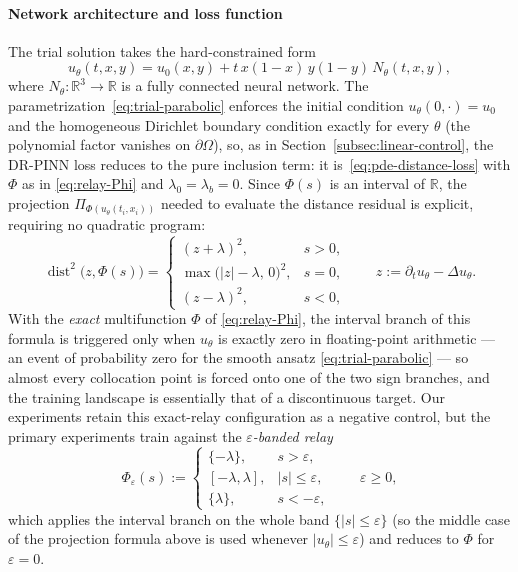 \documentclass[11pt]{elsarticle}
\theoremstyle{definition}
\theoremstyle{remark}
\numberwithin{equation}{section}
\def\dist{\operatorname{dist}}
\begin{document}
\paragraph{Network architecture and loss function}
The trial solution takes the hard-constrained form
\begin{equation}
	\label{eq:trial-parabolic}
	u_\theta(t,x,y)
	= u_0(x,y) + t\,x(1-x)\,y(1-y)\,N_\theta(t,x,y),
\end{equation}
where $N_\theta:\mathbb{R}^3\to\mathbb{R}$ is a fully connected neural
network. The parametrization~\eqref{eq:trial-parabolic} enforces the
initial condition $u_\theta(0,\cdot)=u_0$ and the homogeneous Dirichlet
boundary condition exactly for every $\theta$ (the polynomial factor
vanishes on $\partial\Omega$), so, as in
Section~\ref{subsec:linear-control}, the DR-PINN loss reduces to the pure
inclusion term: it is~\eqref{eq:pde-distance-loss} with
$\Phi$ as in \eqref{eq:relay-Phi} and $\lambda_0=\lambda_b=0$. Since $\Phi(s)$ is an interval of
$\mathbb{R}$, the projection $\Pi_{\Phi(u_\theta(t_i,x_i))}$ needed to
evaluate the distance residual is explicit, requiring no quadratic program:
\[
\dist^2\!\bigl(z,\Phi(s)\bigr)
=
\begin{cases}
(z+\lambda)^2, & s>0,\\[2pt]
\max\bigl(|z|-\lambda,\,0\bigr)^2, & s=0,\\[2pt]
(z-\lambda)^2, & s<0,
\end{cases}
\qquad
z:=\partial_t u_\theta-\Delta u_\theta.
\]
With the \emph{exact} multifunction $\Phi$ of \eqref{eq:relay-Phi}, the
interval branch of this formula is triggered only when $u_\theta$ is
exactly zero in floating-point arithmetic --- an event of probability
zero for the smooth ansatz \eqref{eq:trial-parabolic} --- so almost every
collocation point is forced onto one of the two sign branches, and the
training landscape is essentially that of a discontinuous target. Our
experiments retain this exact-relay configuration as a negative control,
but the primary experiments train against the \emph{$\varepsilon$-banded
relay}
\begin{equation}
	\label{eq:relay-Phi-eps}
	\Phi_\varepsilon(s) :=
	\begin{cases}
		\{-\lambda\}, & s>\varepsilon,\\[2pt]
		[-\lambda,\lambda], & |s|\le\varepsilon,\\[2pt]
		\{\lambda\}, & s<-\varepsilon,
	\end{cases}
	\qquad \varepsilon\ge0,
\end{equation}
which applies the interval branch on the whole band
$\{|s|\le\varepsilon\}$ (so the middle case of the projection formula
above is used whenever $|u_\theta|\le\varepsilon$) and reduces to $\Phi$
for $\varepsilon=0$.
\end{document}
